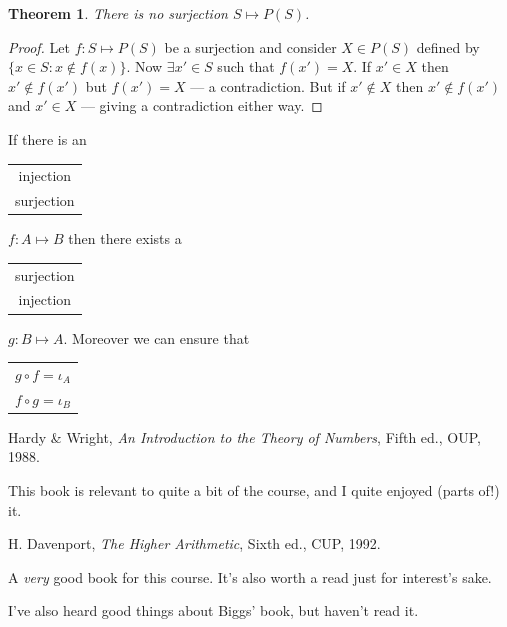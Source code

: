 \documentclass{notes}
\theoremstyle{plain}
\newtheorem{theorem}{Theorem}[chapter]
\begin{document}
\begin{theorem}
There is no surjection $S \mapsto P(S)$.
\end{theorem}

\begin{proof}
Let $f \colon S \mapsto P(S)$ be a surjection and consider
$X \in P(S)$ defined by $ \{ x \in S : x \notin f(x) \}$.  Now
$\exists x' \in S$ such that $f(x') = X$.  If $x' \in X$ then
$x' \notin f(x')$ but $f(x') = X$ --- a contradiction.  But if $x' \notin
X$ then $x' \notin f(x')$ and $x' \in X$ --- giving a contradiction either
way. 
\end{proof}

If there is an \begin{tabular}{c} injection
\\ surjection \end{tabular} $f \colon A \mapsto B$ then there exists
a \begin{tabular}{c} surjection
\\ injection \end{tabular} $g \colon B \mapsto A$.  Moreover we
can ensure that \begin{tabular}{c} $g \circ f = \iota_A$
\\ $f \circ g = \iota_B$ \end{tabular} 

\backmatter

\begin{thebibliography}{9}

 Hardy \& Wright, \emph{An Introduction to the Theory
    of Numbers}, Fifth ed., OUP, 1988.
  
  {\sffamily \small This book is relevant to quite a bit of the
    course, and I quite enjoyed (parts of!) it. }
  
 H. Davenport, \emph{The Higher Arithmetic}, Sixth
  ed., CUP, 1992.
  
  {\sffamily \small A \emph{very} good book for this course.  It's
    also worth a read just for interest's sake. }

\end{thebibliography}

I've also heard good things about Biggs' book, but haven't read
it.
\end{document}

